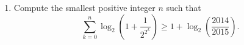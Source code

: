 \documentclass[9pt]{article}
\begin{document}
\begin{enumerate}
$$\begin{tabular}{|c|c|c|}
         \end{tabular}
      $$
      we see that the terms $a_5$, $a_6$, $\cdots$, $a_{13}$ repeat. There are 9
      of these terms and their sum is 21. Thus
      \begin{align*}
         \sum_{i=1}^{1000} a_i &= \sum_{i=1}^{4} a_i + \sum_{i=5}^{994} a_i +
            \sum_{i=995}^{1000} a_i \\
            &= 5 + 21 \cdot 110 + 14 \\
            &= 2329.
      \end{align*}
   \item Compute the smallest positive integer $n$ such that
         \begin{equation} \label{8_1}
            \sum_{k=0}^n\log_2\left(1 + \frac{1}{2^{2^k}}\right) \ge 1 +
              \log_2\left(\frac{2014}{2015}\right).
         \end{equation}
              

\end{enumerate}
\end{document}
